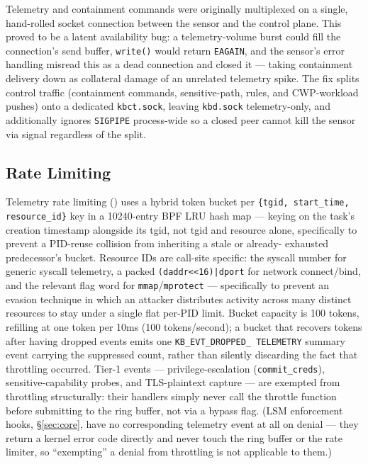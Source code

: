 \documentclass{article}
\begin{document}
Telemetry and containment commands were originally multiplexed on a
single, hand-rolled socket connection between the sensor and the
control plane. This proved to be a latent availability bug: a
telemetry-volume burst could fill the connection's send buffer,
\texttt{write()} would return \texttt{EAGAIN}, and the sensor's error
handling misread this as a dead connection and closed it --- taking
containment delivery down as collateral damage of an unrelated
telemetry spike. The fix splits control traffic (containment commands,
sensitive-path, rules, and CWP-workload pushes) onto a dedicated
\texttt{kbct.sock}, leaving \texttt{kbd.sock} telemetry-only, and
additionally ignores \texttt{SIGPIPE} process-wide so a closed peer
cannot kill the sensor via signal regardless of the split.

\subsection{Rate Limiting}
\label{sec:ratelimit}

Telemetry rate limiting () uses a hybrid token
bucket per \texttt{\{tgid, start\_time, resource\_id\}} key in a
10240-entry BPF LRU hash map --- keying on the task's creation
timestamp alongside its tgid, not tgid and resource alone, specifically
to prevent a PID-reuse collision from inheriting a stale or already-
exhausted predecessor's bucket. Resource IDs are call-site specific:
the syscall number for generic syscall telemetry, a packed
\texttt{(daddr\textless\textless16)|dport} for network connect/bind,
and the relevant flag word for \texttt{mmap}/\texttt{mprotect} ---
specifically to prevent an evasion technique in which an attacker
distributes activity across many distinct resources to stay under a
single flat per-PID limit. Bucket capacity is 100 tokens, refilling at
one token per 10ms (100 tokens/second); a bucket that recovers tokens
after having dropped events emits one \texttt{KB\_EVT\_DROPPED\_
TELEMETRY} summary event carrying the suppressed count, rather than
silently discarding the fact that throttling occurred. Tier-1 events
--- privilege-escalation (\texttt{commit\_creds}), sensitive-capability
probes, and TLS-plaintext capture --- are exempted from throttling
structurally: their handlers simply never call the throttle function
before submitting to the ring buffer, not via a bypass flag. (LSM
enforcement hooks, \S\ref{sec:core}, have no corresponding telemetry
event at all on denial --- they return a kernel error code directly and
never touch the ring buffer or the rate limiter, so ``exempting'' a
denial from throttling is not applicable to them.)
\end{document}
